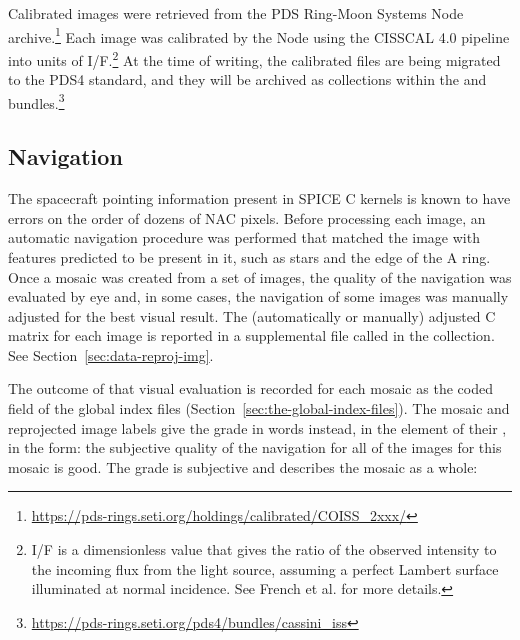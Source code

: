 Calibrated images were retrieved from the PDS Ring-Moon Systems Node archive.\footnote{\href{https://pds-rings.seti.org/holdings/calibrated/COISS_2xxx/}{https://pds-rings.seti.org/holdings/calibrated/COISS\_\allowbreak{}2xxx/}} Each image was calibrated by the Node using the CISSCAL 4.0 pipeline  into units of I/F.\footnote{I/F is a dimensionless value that gives the ratio of the observed intensity to the incoming flux from the light source, assuming a perfect Lambert surface illuminated at normal incidence. See French et al.  for more details.} At the time of writing, the calibrated files are being migrated to the PDS4 standard, and they will be archived as collections within the  and  bundles.\footnote{\href{https://pds-rings.seti.org/pds4/bundles/cassini_iss}{https://pds-rings.seti.org/pds4/bundles/cassini\_\allowbreak{}iss}}


\subsection{Navigation}
\label{sec:navigation}

The spacecraft pointing information present in SPICE C kernels is known to have errors on the order of dozens of NAC pixels. Before processing each image, an automatic navigation procedure  was performed that matched the image with features predicted to be present in it, such as stars and the edge of the A ring. Once a mosaic was created from a set of images, the quality of the navigation was evaluated by eye and, in some cases, the navigation of some images was manually adjusted for the best visual result. The (automatically or manually) adjusted C matrix for each image is reported in a supplemental file called  in the  collection. See Section~\ref{sec:data-reproj-img}.

The outcome of that visual evaluation is recorded for each mosaic as the coded  field of the global index files (Section~\ref{sec:the-global-index-files}). The mosaic and reprojected image labels give the grade in words instead, in the  element of their , in the form: the subjective quality of the navigation for all of the images for this mosaic is \textquotedbl good\textquotedbl. The grade is subjective and describes the mosaic as a whole:

